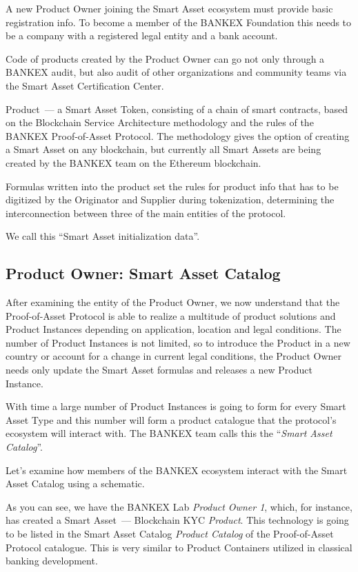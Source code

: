 \documentclass{article}
\begin{document}
\begin{multicols}{2}
A new Product Owner joining the Smart Asset ecosystem must provide basic registration info. To become a member of the BANKEX Foundation this needs to be a company with a registered legal entity and a bank account.

Code of products created by the Product Owner can go not only through a BANKEX audit, but also audit of other organizations and community teams via the Smart Asset Certification Center.

Product~--- a Smart Asset Token, consisting of a chain of smart contracts, based on the Blockchain Service Architecture methodology and the rules of the BANKEX Proof-of-Asset Protocol. The methodology gives the option of creating a Smart Asset on any blockchain, but currently all Smart Assets are being created by the BANKEX team on the Ethereum blockchain. 

Formulas written into the product set the rules for product info that has to be digitized by the Originator and Supplier during tokenization, determining the interconnection between three of the main entities of the protocol.

We call this \enquote{Smart Asset initialization data}.

\subsection{Product Owner: Smart Asset Catalog}

After examining the entity of the Product Owner, we now understand that the Proof-of-Asset Protocol is able to realize a multitude of product solutions and Product Instances depending on application, location and legal conditions. The number of Product Instances is not limited, so to introduce the Product in a new country or account for a change in current legal conditions, the Product Owner needs only update the Smart Asset formulas and releases a new Product Instance. 

With time a large number of Product Instances is going to form for every Smart Asset Type and this number will form a product catalogue that the protocol’s ecosystem will interact with. The BANKEX team calls this the \enquote{\textit{Smart Asset Catalog}}.

Let’s examine how members of the BANKEX ecosystem interact with the Smart Asset Catalog using a schematic. 

As you can see, we have the BANKEX Lab \textit{Product Owner 1}, which, for instance, has created a Smart Asset~--- Blockchain KYC \textit{Product}. This technology is going to be listed in the Smart Asset Catalog \textit{Product Catalog} of the Proof-of-Asset Protocol catalogue. This is very similar to Product Containers utilized in classical banking development.


\end{multicols}
\end{document}
